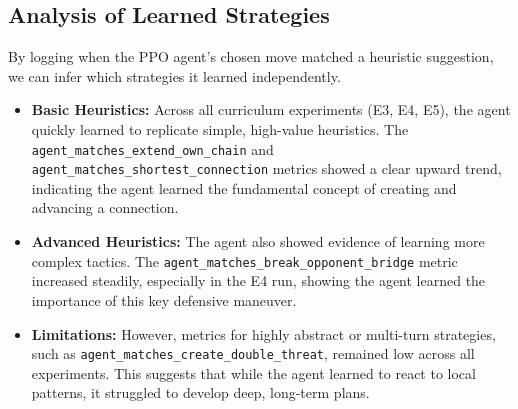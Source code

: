 \documentclass[conference]{IEEEtran}
\begin{document}
\subsection{Analysis of Learned Strategies}
By logging when the PPO agent's chosen move matched a heuristic suggestion, we can infer which strategies it learned independently.
\begin{itemize}
    \item \textbf{Basic Heuristics:} Across all curriculum experiments (E3, E4, E5), the agent quickly learned to replicate simple, high-value heuristics. The \texttt{agent\_matches\_extend\_own\_chain} and \texttt{agent\_matches\_shortest\_connection} metrics showed a clear upward trend, indicating the agent learned the fundamental concept of creating and advancing a connection.
    \item \textbf{Advanced Heuristics:} The agent also showed evidence of learning more complex tactics. The \texttt{agent\_matches\_break\_opponent\_bridge} metric increased steadily, especially in the E4 run, showing the agent learned the importance of this key defensive maneuver.
    \item \textbf{Limitations:} However, metrics for highly abstract or multi-turn strategies, such as \texttt{agent\_matches\_create\_double\_threat}, remained low across all experiments. This suggests that while the agent learned to react to local patterns, it struggled to develop deep, long-term plans.
\end{itemize}
\end{document}
